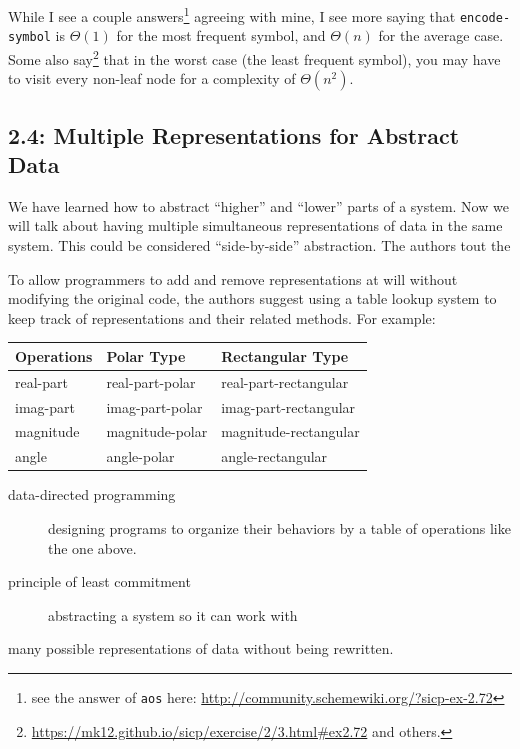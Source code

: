 \documentclass[final,fleqn,titlepage,twoside]{article}
\begin{document}
While I see a couple answers\footnote{see the answer of \texttt{aos} here:
\url{http://community.schemewiki.org/?sicp-ex-2.72}} agreeing with mine, I see more saying that
\texttt{encode-symbol} is \(\Theta(1)\) for the most frequent symbol, and \(\Theta(n)\)
for the average case. Some also say\footnote{\url{https://mk12.github.io/sicp/exercise/2/3.html\#ex2.72} and others.} that in the worst case (the least
frequent symbol), you may have to visit every non-leaf node for a complexity of
\(\Theta(n^2)\).

\subsection{2.4: Multiple Representations for Abstract Data}
\label{sec:org22950c1}
We have learned how to abstract ``higher'' and ``lower'' parts of a system. Now we
will talk about having multiple simultaneous representations of data in the same
system. This could be considered ``side-by-side'' abstraction. The authors tout
the 

To allow programmers to add and remove representations at will without modifying
the original code, the authors suggest using a table lookup system to keep track
of representations and their related methods. For example:

\begin{center}
\begin{tabular}{l|ll}
Operations & Polar Type & Rectangular Type\\[0pt]
\hline
real-part & real-part-polar & real-part-rectangular\\[0pt]
imag-part & imag-part-polar & imag-part-rectangular\\[0pt]
magnitude & magnitude-polar & magnitude-rectangular\\[0pt]
angle & angle-polar & angle-rectangular\\[0pt]
\end{tabular}
\end{center}

\begin{description}
\item[{data-directed programming}] designing programs to organize their behaviors
by a table of operations like the one above.
\item[{principle of least commitment}] abstracting a system so it can work with
\end{description}
many possible representations of data without being rewritten.
\end{document}
